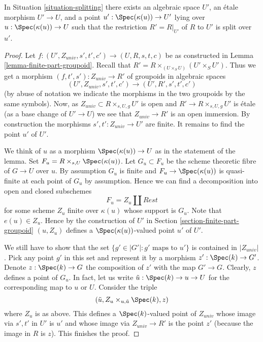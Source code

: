 \begin{lemma}
\label{lemma-splitting}
In Situation \ref{situation-splitting}
there exists an algebraic space $U'$, an \'etale morphism
$U' \to U$, and a point $u' : \Spec(\kappa(u)) \to U'$
lying over $u : \Spec(\kappa(u)) \to U$
such that the restriction $R' = R|_{U'}$ of $R$ to $U'$
is split over $u'$.
\end{lemma}

\begin{proof}
Let $f : (U', Z_{univ}, s', t', c') \to (U, R, s, t, c)$ be as constructed in
Lemma \ref{lemma-finite-part-groupoid}.
Recall that $R' = R \times_{(U \times_S U)} (U' \times_S U')$.
Thus we get a morphism $(f, t', s') : Z_{univ} \to R'$ of groupoids
in algebraic spaces
$$
(U', Z_{univ}, s', t', c') \to (U', R', s', t', c')
$$
(by abuse of notation we indicate the morphisms in the two groupoids
by the same symbols). Now, as $Z_{univ} \subset R \times_{s, U, g} U'$ is open
and $R' \to R \times_{s, U, g} U'$ is \'etale (as a base change
of $U' \to U$) we see that $Z_{univ} \to R'$ is an open immersion.
By construction the morphisms $s', t' : Z_{univ} \to U'$ are finite.
It remains to find the point $u'$ of $U'$.

\medskip\noindent
We think of $u$ as a morphism $\Spec(\kappa(u)) \to U$ as in
the statement of the lemma. Set $F_u = R \times_{s, U} \Spec(\kappa(u))$.
Let $G_u \subset F_u$ be the scheme theoretic fibre of $G \to U$ over $u$.
By assumption $G_u$ is finite and $F_u \to \Spec(\kappa(u))$
is quasi-finite at each point of $G_u$ by assumption.
Hence we can find a decomposition into open and closed subschemes
$$
F_u = Z_u \amalg Rest
$$
for some scheme $Z_u$ finite over $\kappa(u)$ whose support is $G_u$.
Note that $e(u) \in Z_u$. Hence by the construction of $U'$ in
Section \ref{section-finite-part-groupoid}
$(u, Z_u)$ defines a $\Spec(\kappa(u))$-valued
point $u'$ of $U'$.

\medskip\noindent
We still have to show that the set $\{g' \in |G'| : g'\text{ maps to }u'\}$
is contained in $|Z_{univ}|$. Pick any point $g'$ in this set and
represent it by a morphism $z' : \Spec(k) \to G'$. Denote
$z : \Spec(k) \to G$ the composition of $z'$ with the map $G' \to G$.
Clearly, $z$ defines a point of $G_u$. In fact, let us write
$\tilde u : \Spec(k) \to u \to U$ for the corresponding map to $u$ or $U$.
Consider the triple
$$
(\tilde u, Z_u \times_{u, \tilde u} \Spec(k), z)
$$
where $Z_u$ is as above. This defines a $\Spec(k)$-valued point
of $Z_{univ}$ whose image via $s', t'$ in $U'$ is $u'$ and
whose image via $Z_{univ} \to R'$ is the point $z'$
(because the image in $R$ is $z$).
This finishes the proof.
\end{proof}

